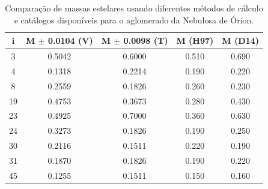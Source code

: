 \begin{table}[htbp]
\centering
\caption[Resultados de massas estelares para ONC]{Comparação de massas estelares usando diferentes métodos de cálculo e catálogos disponíveis para o aglomerado da Nebulosa de Órion.}
\label{tab:onc_massas}
\begin{tabular}{ccccc}
\hline
{i} & {M $\pm$ 0.0104 (V)} & {M $\pm$ 0.0098 (T)} & {M (H97)} & {M (D14)}\\ \hline
        3   & 0.5042 & 0.6000 & 0.510 & 0.690 \\
		4   & 0.1318 & 0.2214 & 0.190 & 0.220 \\
		8   & 0.2559 & 0.1826 & 0.260 & 0.230 \\
		19  & 0.4753 & 0.3673 & 0.280 & 0.430 \\
		23  & 0.4925 & 0.7000 & 0.360 & 0.630 \\
		24  & 0.3273 & 0.1826 & 0.190 & 0.250 \\
		30  & 0.2116 & 0.1511 & 0.220 & 0.190 \\
		31  & 0.1870 & 0.1826 & 0.190 & 0.220 \\
		45  & 0.1255 & 0.1511 & 0.150 & 0.160 \\
\hline
\end{tabular}
\end{table}
